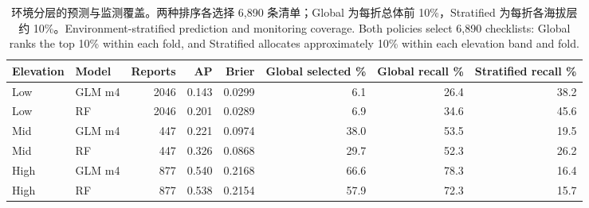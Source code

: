 \begin{table}[htbp]\centering\footnotesize
\caption{\ifzh 环境分层的预测与监测覆盖。两种排序各选择 6,890 条清单；Global 为每折总体前 10\%，Stratified 为每折各海拔层约 10\%。\else Environment-stratified prediction and monitoring coverage. Both policies select 6,890 checklists: Global ranks the top 10\% within each fold, and Stratified allocates approximately 10\% within each elevation band and fold.\fi}\label{tab:envmonitor}
\begin{adjustbox}{max width=\linewidth}\begin{tabular}{llrrrrrr}\toprule
Elevation & Model & Reports & AP & Brier & Global selected \% & Global recall \% & Stratified recall \% \\ \midrule
Low & GLM m4 & 2046 & 0.143 & 0.0299 & 6.1 & 26.4 & 38.2 \\
Low & RF & 2046 & 0.201 & 0.0289 & 6.9 & 34.6 & 45.6 \\
Mid & GLM m4 & 447 & 0.221 & 0.0974 & 38.0 & 53.5 & 19.5 \\
Mid & RF & 447 & 0.326 & 0.0868 & 29.7 & 52.3 & 26.2 \\
High & GLM m4 & 877 & 0.540 & 0.2168 & 66.6 & 78.3 & 16.4 \\
High & RF & 877 & 0.538 & 0.2154 & 57.9 & 72.3 & 15.7 \\
\bottomrule\end{tabular}\end{adjustbox}

\end{table}
